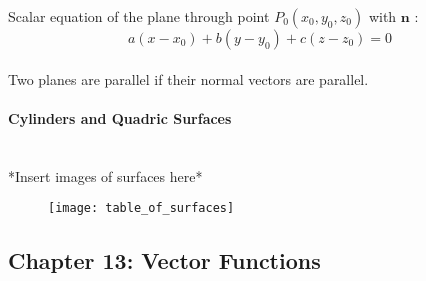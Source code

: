 \documentclass{article}
\begin{document}
Scalar equation of the plane through point \(P_0(x_0, y_0, z_0)\) with \(\mathbf{n}\) :\\
\begin{equation}
    a(x-x_0) + b(y-y_0) + c(z-z_0) = 0
\end{equation}\\

Two planes are parallel if their normal vectors are parallel.\\

\paragraph{Cylinders and Quadric Surfaces}\mbox{}\\
*Insert images of surfaces here*\\

\begin{figure}[t]
    \centering
    \texttt{[image: table\_of\_surfaces]}
\end{figure}


\subsection*{Chapter 13: Vector Functions}
\end{document}
